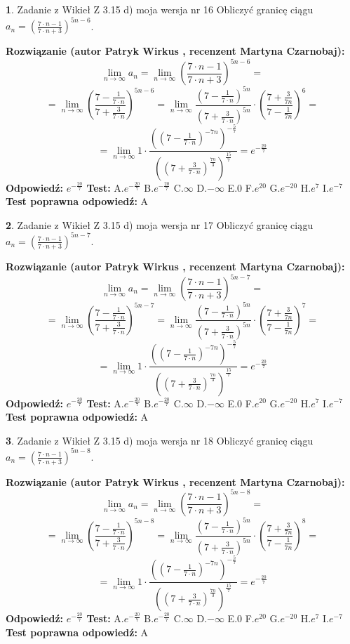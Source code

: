 \documentclass[12pt, a4paper]{article}
\theoremstyle{definition} %
\newtheorem{zad}{}
\newcommand{\zadStart}[1]{\begin{zad}#1\newline}
\newcommand{\zadStop}{\end{zad}}
\newcommand{\rozwStart}[2]{\noindent \textbf{Rozwiązanie (autor #1 , recenzent #2): }\newline}
\newcommand{\rozwStop}{\newline}
\newcommand{\odpStart}{\noindent \textbf{Odpowiedź:}\newline}
\newcommand{\odpStop}{\newline}
\newcommand{\testStart}{\noindent \textbf{Test:}\newline}
\newcommand{\testStop}{\newline}
\newcommand{\kluczStart}{\noindent \textbf{Test poprawna odpowiedź:}\newline}
\newcommand{\kluczStop}{\newline}
\begin{document}
\zadStart{Zadanie z Wikieł Z 3.15 d) moja wersja nr 16}
Obliczyć granicę ciągu $a_{n}=(\frac{7\cdot n - 1}{7 \cdot n + 3})^{5n-6}$.
\zadStop
\rozwStart{Patryk Wirkus}{Martyna Czarnobaj}
$$\lim\limits_{n\to\infty} a_{n} = \lim\limits_{n\to\infty}(\frac{7\cdot n - 1}{7 \cdot n + 3})^{5n-6}=$$
$$=\lim\limits_{n\to\infty}(\frac{7 - \frac{1}{7\cdot n}}{7 + \frac{3}{7 \cdot n}})^{5n-6}=\lim\limits_{n\to\infty}\frac{(7 - \frac{1}{7\cdot n})^{5n}}{(7 + \frac{3}{7\cdot n})^{5n}} \cdot (\frac{7+\frac{3}{7n}}{7-\frac{1}{7n}})^{6}=$$
$$=\lim\limits_{n\to\infty} 1 \cdot \frac{((7-\frac{1}{7 \cdot n})^{-7n})^{-\frac{5}{7}}}{((7+\frac{3}{7 \cdot n})^{\frac{7n}{3}})^{\frac{15}{7}}} =e^{-\frac{20}{7}}$$
\rozwStop
\odpStart
$e^{-\frac{20}{7}}$
\odpStop
\testStart
A.$ e^{-\frac{20}{7}}$
B.$ e^{-\frac{20}{7}}$
C.$\infty$
D.$-\infty$
E.$0$
F.$e^{20}$
G.$e^{-20}$
H.$e^{7}$
I.$e^{-7}$
\testStop
\kluczStart
A
\kluczStop



\zadStart{Zadanie z Wikieł Z 3.15 d) moja wersja nr 17}
Obliczyć granicę ciągu $a_{n}=(\frac{7\cdot n - 1}{7 \cdot n + 3})^{5n-7}$.
\zadStop
\rozwStart{Patryk Wirkus}{Martyna Czarnobaj}
$$\lim\limits_{n\to\infty} a_{n} = \lim\limits_{n\to\infty}(\frac{7\cdot n - 1}{7 \cdot n + 3})^{5n-7}=$$
$$=\lim\limits_{n\to\infty}(\frac{7 - \frac{1}{7\cdot n}}{7 + \frac{3}{7 \cdot n}})^{5n-7}=\lim\limits_{n\to\infty}\frac{(7 - \frac{1}{7\cdot n})^{5n}}{(7 + \frac{3}{7\cdot n})^{5n}} \cdot (\frac{7+\frac{3}{7n}}{7-\frac{1}{7n}})^{7}=$$
$$=\lim\limits_{n\to\infty} 1 \cdot \frac{((7-\frac{1}{7 \cdot n})^{-7n})^{-\frac{5}{7}}}{((7+\frac{3}{7 \cdot n})^{\frac{7n}{3}})^{\frac{15}{7}}} =e^{-\frac{20}{7}}$$
\rozwStop
\odpStart
$e^{-\frac{20}{7}}$
\odpStop
\testStart
A.$ e^{-\frac{20}{7}}$
B.$ e^{-\frac{20}{7}}$
C.$\infty$
D.$-\infty$
E.$0$
F.$e^{20}$
G.$e^{-20}$
H.$e^{7}$
I.$e^{-7}$
\testStop
\kluczStart
A
\kluczStop



\zadStart{Zadanie z Wikieł Z 3.15 d) moja wersja nr 18}
Obliczyć granicę ciągu $a_{n}=(\frac{7\cdot n - 1}{7 \cdot n + 3})^{5n-8}$.
\zadStop
\rozwStart{Patryk Wirkus}{Martyna Czarnobaj}
$$\lim\limits_{n\to\infty} a_{n} = \lim\limits_{n\to\infty}(\frac{7\cdot n - 1}{7 \cdot n + 3})^{5n-8}=$$
$$=\lim\limits_{n\to\infty}(\frac{7 - \frac{1}{7\cdot n}}{7 + \frac{3}{7 \cdot n}})^{5n-8}=\lim\limits_{n\to\infty}\frac{(7 - \frac{1}{7\cdot n})^{5n}}{(7 + \frac{3}{7\cdot n})^{5n}} \cdot (\frac{7+\frac{3}{7n}}{7-\frac{1}{7n}})^{8}=$$
$$=\lim\limits_{n\to\infty} 1 \cdot \frac{((7-\frac{1}{7 \cdot n})^{-7n})^{-\frac{5}{7}}}{((7+\frac{3}{7 \cdot n})^{\frac{7n}{3}})^{\frac{15}{7}}} =e^{-\frac{20}{7}}$$
\rozwStop
\odpStart
$e^{-\frac{20}{7}}$
\odpStop
\testStart
A.$ e^{-\frac{20}{7}}$
B.$ e^{-\frac{20}{7}}$
C.$\infty$
D.$-\infty$
E.$0$
F.$e^{20}$
G.$e^{-20}$
H.$e^{7}$
I.$e^{-7}$
\testStop
\kluczStart
A
\kluczStop
\end{document}
